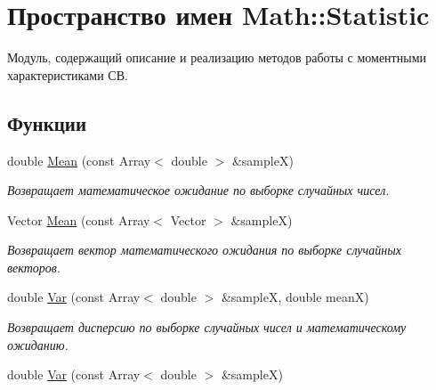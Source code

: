 \hypertarget{namespace_math_1_1_statistic}{}\section{Пространство имен Math\+:\+:Statistic}
\label{namespace_math_1_1_statistic}


Модуль, содержащий описание и реализацию методов работы с моментными характеристиками СВ.  


\subsection*{Функции}
\begin{DoxyCompactItemize}
\item 
double \hyperlink{namespace_math_1_1_statistic_a6cc81f7b570cb75924f0c4baf46181ee}{Mean} (const Array$<$ double $>$ \&sampleX)\hypertarget{namespace_math_1_1_statistic_a6cc81f7b570cb75924f0c4baf46181ee}{}\label{namespace_math_1_1_statistic_a6cc81f7b570cb75924f0c4baf46181ee}

\begin{DoxyCompactList}\small\item\em Возвращает математическое ожидание по выборке случайных чисел. \end{DoxyCompactList}\item 
Vector \hyperlink{namespace_math_1_1_statistic_aed3f3d054a2aa64bf15cd3694d087ef7}{Mean} (const Array$<$ Vector $>$ \&sampleX)\hypertarget{namespace_math_1_1_statistic_aed3f3d054a2aa64bf15cd3694d087ef7}{}\label{namespace_math_1_1_statistic_aed3f3d054a2aa64bf15cd3694d087ef7}

\begin{DoxyCompactList}\small\item\em Возвращает вектор математического ожидания по выборке случайных векторов. \end{DoxyCompactList}\item 
double \hyperlink{namespace_math_1_1_statistic_a456a80dd9114c6ee20b8c46ac6e73537}{Var} (const Array$<$ double $>$ \&sampleX, double meanX)\hypertarget{namespace_math_1_1_statistic_a456a80dd9114c6ee20b8c46ac6e73537}{}\label{namespace_math_1_1_statistic_a456a80dd9114c6ee20b8c46ac6e73537}

\begin{DoxyCompactList}\small\item\em Возвращает дисперсию по выборке случайных чисел и математическому ожиданию. \end{DoxyCompactList}\item 
double \hyperlink{namespace_math_1_1_statistic_a4fa57184d4396f0f85cf07d8d1f80d19}{Var} (const Array$<$ double $>$ \&sampleX)\hypertarget{namespace_math_1_1_statistic_a4fa57184d4396f0f85cf07d8d1f80d19}{}\label{namespace_math_1_1_statistic_a4fa57184d4396f0f85cf07d8d1f80d19}


\end{DoxyCompactItemize}
